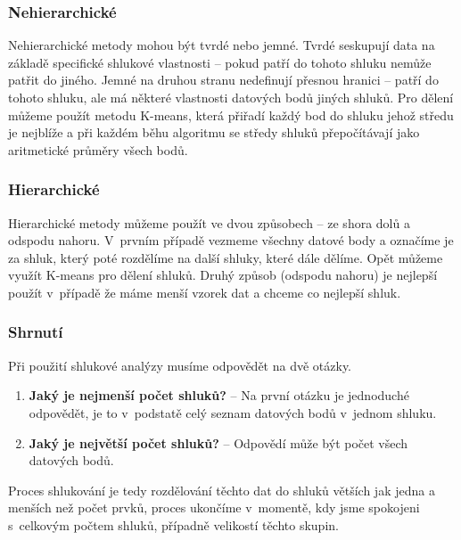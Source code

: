 \subsubsection{Nehierarchické}
\par Nehierarchické metody mohou být tvrdé nebo jemné. Tvrdé seskupují data na základě specifické shlukové vlastnosti -- pokud patří do tohoto shluku nemůže patřit do jiného. Jemné na druhou stranu nedefinují přesnou hranici -- patří do tohoto shluku, ale má některé vlastnosti datových bodů jiných shluků. Pro dělení můžeme použít metodu K-means, která přiřadí každý bod do shluku jehož středu je nejblíže a při každém běhu algoritmu se středy shluků přepočítávají jako aritmetické průměry všech bodů. \cite{big-data-anayitics}

\subsubsection{Hierarchické}
\par Hierarchické metody můžeme použít ve dvou způsobech -- ze shora dolů a odspodu nahoru. V~prvním případě vezmeme všechny datové body a označíme je za shluk, který poté rozdělíme na další shluky, které dále dělíme. Opět můžeme využít K-means pro dělení shluků. Druhý způsob (odspodu nahoru) je nejlepší použít v~případě že máme menší vzorek dat a chceme co nejlepší shluk. \cite{big-data-anayitics}

\subsubsection{Shrnutí}
\par Při použití shlukové analýzy musíme odpovědět na dvě otázky.
\begin{enumerate}
  \item \textbf{Jaký je nejmenší počet shluků?} -- Na první otázku je jednoduché odpovědět, je to v~podstatě celý seznam datových bodů v~jednom shluku.
  \item \textbf{Jaký je největší počet shluků?} -- Odpovědí může být počet všech datových bodů.
\end{enumerate}
Proces shlukování je tedy rozdělování těchto dat do shluků větších jak jedna a menších než počet prvků, proces ukončíme v~momentě, kdy jsme spokojeni s~celkovým počtem shluků, případně velikostí těchto skupin. \cite{data-mining-practical}

